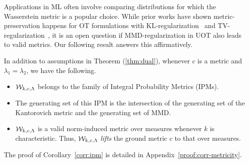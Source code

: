 Applications in ML often involve comparing distributions for which the Wasserstein metric is a popular choice. While prior works have shown metric-preservation happens for OT formulations with KL-regularization~\citep{Liero2018} and TV-regularization~\citep{pic2016}, it is an open question if MMD-regularization in UOT also leads to valid metrics. Our following result answers this affirmatively.
\begin{corollaryBox}
\begin{corollary}\label{corr:ipm} 
In addition to assumptions in Theorem (\ref{thm:dual}), whenever $c$ is a metric and $\lambda_1=\lambda_2$, we have the following.
\begin{itemize}
    \item $\mathcal{W}_{k, c, \Lambda}$ belongs to the family of Integral Probability Metrics (IPMs).
    \item The generating set of this IPM is the intersection of the generating set of the Kantorovich metric and the generating set of MMD.
    \item $\mathcal{W}_{k, c, \Lambda}$ is a valid norm-induced metric over measures whenever $k$ is characteristic. Thus, $\mathcal{W}_{k, c, \Lambda}$ \emph{lifts} the ground metric $c$ to that over measures.
\end{itemize}
\end{corollary}
\end{corollaryBox}
The proof of Corollary~\ref{corr:ipm} is detailed in Appendix~\ref{proof:corr-metricity}.

